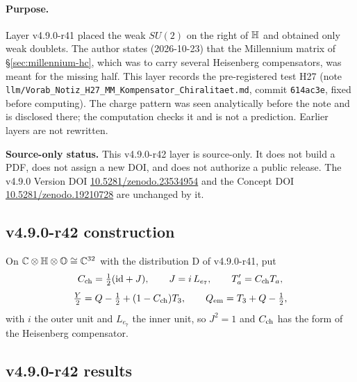 \paragraph{Purpose.}
Layer v4.9.0-r41 placed the weak \(SU(2)\) on the right of \(\mathbb{H}\) and obtained only weak doublets.  The author states (2026-10-23) that
the Millennium matrix of \S\ref{sec:millennium-hc}, which was to carry several Heisenberg compensators, was meant for the missing half.
This layer records the pre-registered test H27 (note \texttt{llm/Vorab\_Notiz\_H27\_MM\_Kompensator\_Chiralitaet.md}, commit
\texttt{614ac3e}, fixed before computing).  The charge pattern was seen analytically before the note and is disclosed there; the
computation checks it and is not a prediction.  Earlier layers are not rewritten.

\noindent\textbf{Source-only status.}
This v4.9.0-r42 layer is source-only.  It does not build a PDF, does not assign a new DOI,
and does not authorize a public release.  The v4.9.0 Version DOI
\href{https://doi.org/10.5281/zenodo.23534954}{10.5281/zenodo.23534954} and the Concept DOI
\href{https://doi.org/10.5281/zenodo.19210728}{10.5281/zenodo.19210728} are unchanged by it.

\subsection*{v4.9.0-r42 construction}
\label{subsec:v490-r42-construction}

On \(\mathbb C\otimes\mathbb{H}\otimes\mathbb{O}\cong\mathbb C^{32}\) with the distribution D of v4.9.0-r41, put
\[
C_{\rm ch}=\tfrac12(\mathrm{id}+J),\qquad J=i\,L_{e_7},\qquad T_a'=C_{\rm ch}T_a,
\]
\[
\tfrac{Y}{2}=Q-\tfrac12+(1-C_{\rm ch})T_3,\qquad Q_{\rm em}=T_3+Q-\tfrac12 ,
\]
with \(i\) the outer unit and \(L_{e_7}\) the inner unit, so \(J^2=1\) and \(C_{\rm ch}\) has the form of the Heisenberg compensator.

\subsection*{v4.9.0-r42 results}
\label{subsec:v490-r42-results}

